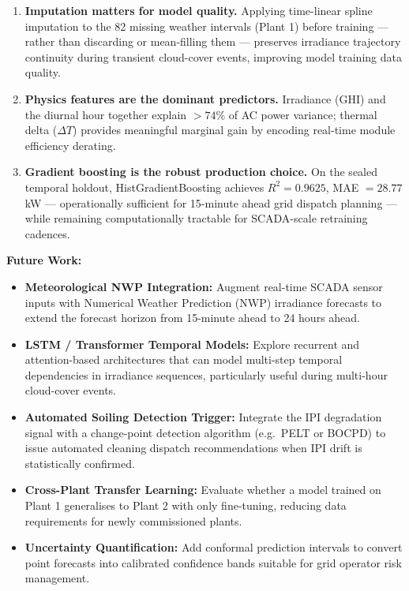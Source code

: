 \documentclass[10pt,a4paper]{article}
\begin{document}
\begin{enumerate}[leftmargin=14pt,itemsep=2pt,topsep=2pt,parsep=0pt]
    \item \textbf{Imputation matters for model quality.} Applying time-linear spline imputation to the 82 missing weather intervals (Plant 1) before training — rather than discarding or mean-filling them — preserves irradiance trajectory continuity during transient cloud-cover events, improving model training data quality.
    \item \textbf{Physics features are the dominant predictors.} Irradiance (GHI) and the diurnal hour together explain $>74\%$ of AC power variance; thermal delta ($\Delta T$) provides meaningful marginal gain by encoding real-time module efficiency derating.
    \item \textbf{Gradient boosting is the robust production choice.} On the sealed temporal holdout, HistGradientBoosting achieves $R^2 = 0.9625$, MAE $= 28.77$ kW — operationally sufficient for 15-minute ahead grid dispatch planning — while remaining computationally tractable for SCADA-scale retraining cadences.
\end{enumerate}

\textbf{Future Work:}
\begin{itemize}[leftmargin=14pt,itemsep=1.5pt,topsep=2pt,parsep=0pt]
    \item \textbf{Meteorological NWP Integration:} Augment real-time SCADA sensor inputs with Numerical Weather Prediction (NWP) irradiance forecasts to extend the forecast horizon from 15-minute ahead to 24 hours ahead.
    \item \textbf{LSTM / Transformer Temporal Models:} Explore recurrent and attention-based architectures that can model multi-step temporal dependencies in irradiance sequences, particularly useful during multi-hour cloud-cover events.
    \item \textbf{Automated Soiling Detection Trigger:} Integrate the IPI degradation signal with a change-point detection algorithm (e.g.\ PELT or BOCPD) to issue automated cleaning dispatch recommendations when IPI drift is statistically confirmed.
    \item \textbf{Cross-Plant Transfer Learning:} Evaluate whether a model trained on Plant 1 generalises to Plant 2 with only fine-tuning, reducing data requirements for newly commissioned plants.
    \item \textbf{Uncertainty Quantification:} Add conformal prediction intervals to convert point forecasts into calibrated confidence bands suitable for grid operator risk management.
\end{itemize}
\end{document}
